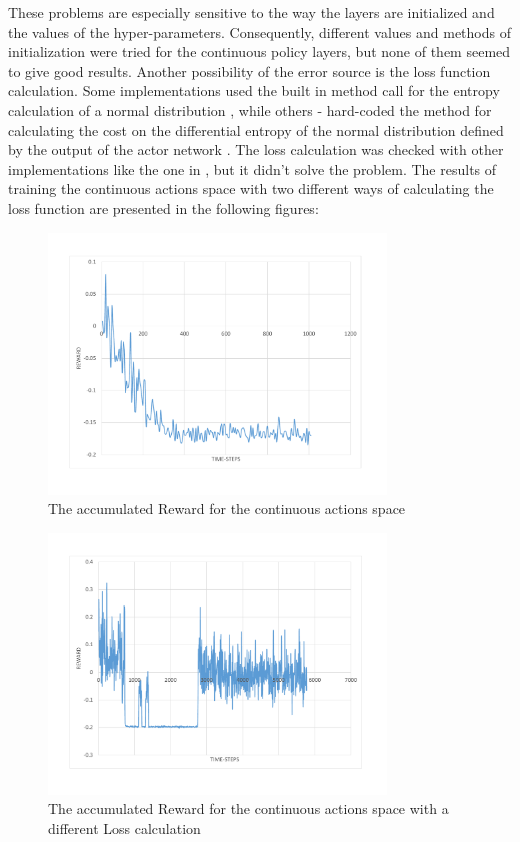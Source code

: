 These problems are especially sensitive to the way the layers are initialized and the values of the hyper-parameters. Consequently, different values and methods of initialization were tried for the continuous policy layers, but none of them seemed to give good results. Another possibility of the error source is the loss function calculation. Some implementations used the built in method call for the entropy calculation of a normal distribution \cite{A3CImplementation}, while others - hard-coded the method for calculating the cost on the differential entropy of the normal distribution defined by the output of the actor network \cite{DBLP:journals/corr/MnihBMGLHSK16}. The loss calculation was checked with other implementations like the one in \cite{A3CLoss}, but it didn't solve the problem. The results of training the continuous actions space with two different ways of calculating the loss function are presented in the following figures:
\begin{figure}[H]
	\centering
	\includegraphics[width=0.8\textwidth]{Figures/ContinuousLoss1}
	\caption{The accumulated Reward for the continuous actions space}
	\label{fig:ContinuousLoss1}
\end{figure}
\begin{figure}[H]
	\centering
	\includegraphics[width=0.8\textwidth]{Figures/ContinuousLoss2}
	\caption{The accumulated Reward for the continuous actions space with a different Loss calculation}
	\label{fig:ContinuousLoss2}
\end{figure}

